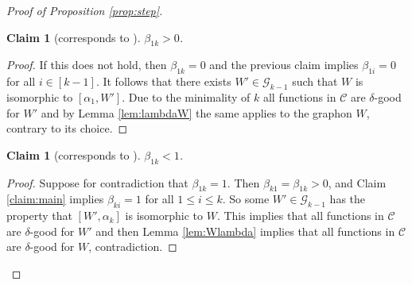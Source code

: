 \documentclass[11pt]{article}
\newtheorem{claim}[thm]{Claim}
\theoremstyle{definition}
\newcommand{\C}{\mathscr{C}}
\begin{document}
\begin{proof}[Proof of Proposition \ref{prop:step}]
    \begin{claim}[corresponds to {\cite[Claim 3.9]{RW}}] \label{claim:beta0}
        $\beta_{1k} >0$.
    \end{claim}

    \begin{proof}
        If this does not hold, then $\beta_{1k} = 0$ and the previous claim implies $\beta_{1i} = 0$ for all $i \in [k-1]$. It follows that there exists $W' \in \mathcal G_{k-1}$ such that $W$ is isomorphic to $[\alpha_1, W']$. Due to the minimality of $k$ all functions in $\C$ are $\delta$-good for $W'$ and by Lemma \ref{lem:lambdaW} the same applies to the graphon $W$, contrary to its choice.
    \end{proof}

    \begin{claim}[corresponds to {\cite[Claim 3.10]{RW}}] \label{claim:beta1}
        $\beta_{1k} <1$.
    \end{claim}

    \begin{proof}
        Suppose for contradiction that $\beta_{1k}=1$. Then $\beta_{k1} = \beta_{1k}>0$, and Claim \ref{claim:main} implies $\beta_{ki} = 1$ for all $1\le i \le k$. So some  $W' \in \mathcal G_{k-1}$ has the property that $[W', \alpha_k]$ is isomorphic to $W$. This implies that all functions in $\C$ are $\delta$-good for $W'$ and then Lemma \ref{lem:Wlambda} implies that all functions in $\C$ are $\delta$-good for $W$, contradiction.
    \end{proof}


\end{proof}
\end{document}
